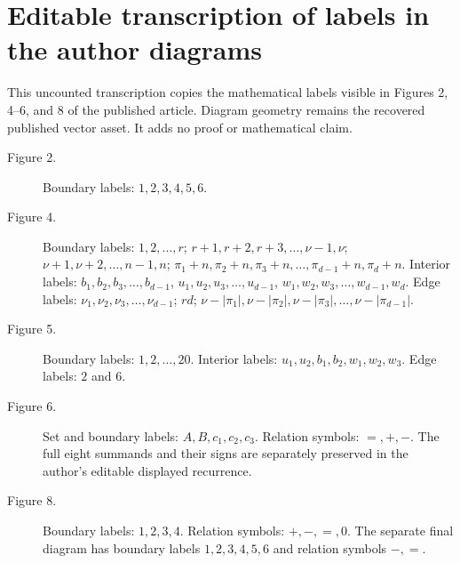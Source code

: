 \section*{Editable transcription of labels in the author diagrams}
This uncounted transcription copies the mathematical labels visible in Figures 2, 4--6, and 8 of the published article. Diagram geometry remains the recovered published vector asset. It adds no proof or mathematical claim.
\begin{description}
\item[Figure 2.] Boundary labels: $1,2,3,4,5,6$.
\item[Figure 4.] Boundary labels: $1,2,\ldots,r$; $r+1,r+2,r+3,\ldots,\nu-1,\nu$; $\nu+1,\nu+2,\ldots,n-1,n$; $\pi_1+n,\pi_2+n,\pi_3+n,\ldots,\pi_{d-1}+n,\pi_d+n$. Interior labels: $b_1,b_2,b_3,\ldots,b_{d-1}$, $u_1,u_2,u_3,\ldots,u_{d-1}$, $w_1,w_2,w_3,\ldots,w_{d-1},w_d$. Edge labels: $\nu_1,\nu_2,\nu_3,\ldots,\nu_{d-1}$; $rd$; $\nu-|\pi_1|,\nu-|\pi_2|,\nu-|\pi_3|,\ldots,\nu-|\pi_{d-1}|$.
\item[Figure 5.] Boundary labels: $1,2,\ldots,20$. Interior labels: $u_1,u_2,b_1,b_2,w_1,w_2,w_3$. Edge labels: $2$ and $6$.
\item[Figure 6.] Set and boundary labels: $A,B,c_1,c_2,c_3$. Relation symbols: $=,+,-$. The full eight summands and their signs are separately preserved in the author's editable displayed recurrence.
\item[Figure 8.] Boundary labels: $1,2,3,4$. Relation symbols: $+,-,=,0$. The separate final diagram has boundary labels $1,2,3,4,5,6$ and relation symbols $-,=$.
\end{description}
